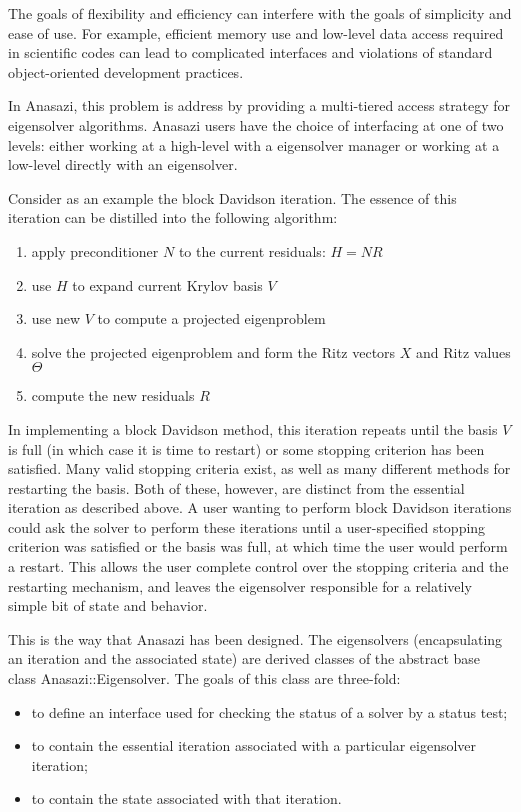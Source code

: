 The goals of flexibility and efficiency can interfere with the goals of simplicity and
ease of use. For example, efficient memory use and low-level data access required in
scientific codes can lead to complicated interfaces and violations of standard
object-oriented development practices.

In Anasazi, this problem is address by providing a multi-tiered access strategy for
eigensolver algorithms. Anasazi users have the choice of interfacing at one of two levels:
either working at a high-level with a eigensolver manager or working at a low-level
directly with an eigensolver.

Consider as an example the block Davidson iteration. The essence of this iteration can be
distilled into the following algorithm:
\begin{enumerate}
  \item apply preconditioner $N$ to the current residuals: $H = N R$
  \item use $H$ to expand current Krylov basis $V$
  \item use new $V$ to compute a projected eigenproblem
  \item solve the projected eigenproblem and form the Ritz vectors $X$ and Ritz values
    $\Theta$ 
  \item compute the new residuals $R$
\end{enumerate}

In implementing a block Davidson method, this iteration repeats until the basis $V$ is full
(in which case it is time to restart) or some stopping criterion has been satisfied. Many
valid stopping criteria exist, as well as many different methods for restarting the basis.
Both of these, however, are distinct from the essential iteration as described above. A
user wanting to perform block Davidson iterations could ask the solver to perform these
iterations until a user-specified stopping criterion was satisfied or the basis was full,
at which time the user would perform a restart. This allows the user complete control over
the stopping criteria and the restarting mechanism, and leaves the eigensolver responsible
for a relatively simple bit of state and behavior.

This is the way that Anasazi has been designed. The eigensolvers (encapsulating an
iteration and the associated state) are derived classes of the abstract base class
Anasazi::Eigensolver. The goals of this class are three-fold:
\begin{itemize}
  \item to define an interface used for checking the status of a solver by a status test;
  \item to contain the essential iteration associated with a particular eigensolver iteration;
  \item to contain the state associated with that iteration.
\end{itemize}

